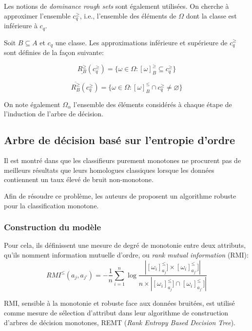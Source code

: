 \documentclass[a4paper]{article}
\begin{document}
Les notions de \emph{dominance rough sets} sont également utilisées. On
cherche à approximer l'ensemble $c^{\geq}_q$, i.e., l'ensemble des éléments de
$\Omega$ dont la classe est inférieure à $c_q$.

\noindent Soit $B \subseteq A$ et $c_q$ une classe. Les approximations
inférieure et supérieure de $c^{\geq}_q$ sont définies \cite{hu-rank} de la
façon suivante:

$$ \underline{R^{\geq}_B}(c^{\geq}_q) = \{\omega \in \Omega :
[\omega]^{\geq}_B \subseteq c^{\geq}_q\}$$

$$ \overline{R^{\geq}_B}(c^{\geq}_q) = \{\omega \in \Omega :
[\omega]^{\leq}_B \cap c^{\geq}_q \neq \varnothing\}$$

On note également $\Omega_{\alpha}$ l'ensemble des éléments considérés à chaque
étape de l'induction de l'arbre de décision.

\subsection{Arbre de décision basé sur l'entropie d'ordre}
Il est montré dans \cite{ben-adding} que les classifieurs purement monotones ne
procurent pas de meilleurs résultats que leurs homologues classiques lorsque les
données contiennent un taux élevé de bruit non-monotone. 

Afin de résoudre ce problème, les auteurs de \cite{hu-rank} proposent un algorithme robuste pour la
classification monotone.

\subsubsection{Construction du modèle}

Pour cela, ils définissent une mesure de degré de monotonie entre deux
attributs, qu'ils nomment information mutuelle d'ordre, ou
\emph{rank mutual information} (RMI): \\

\begin{equation}
    RMI^{\leq}(a_j, a_{j'}) = -\frac{1}{n} \sum_{i=1}^{n} \log
    \frac{|[\omega_i]^{\leq}_{a_j}] \times [\omega_i]^{\leq}_{a_{j'}}]|}{n \times
    |[\omega_i]^{\leq}_{a_j}]\cap [\omega_i]^{\leq}_{a_{j'}}]|}
\label{eq:RMI}
\end{equation}

RMI, sensible à la monotonie et robuste face aux données bruitées, est utilisé
comme mesure de sélection d'attribut dans leur algorithme de construction
d'arbres de décision monotones, REMT (\emph{Rank Entropy Based Decision
Tree}).
\end{document}
